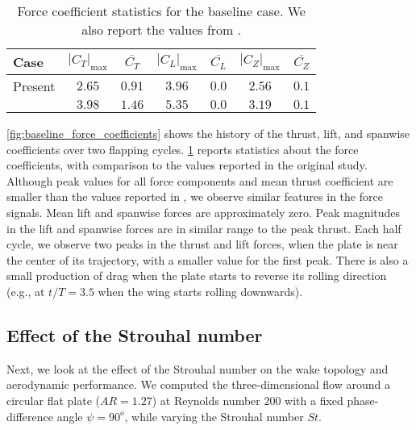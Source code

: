 \begin{table}[!h]
  \centering
  \begin{tabular}{lcccccc}
    \hline\hline
    Case & $\left| C_T \right|_\text{max}$ & $\overline{C_T}$ & $\left| C_L \right|_\text{max}$ & $\overline{C_L}$ & $\left| C_Z \right|_\text{max}$ & $\overline{C_Z}$ \\
    \hline
    Present & $2.65$ & $0.91$ & $3.96$ & $0.0$ & $2.56$ & $0.1$ \\
    \citet{li_dong_2016} & $3.98$ & $1.46$ & $5.35$ & $0.0$ & $3.19$ & $0.1$ \\
    \hline\hline
  \end{tabular}
  \caption{Force coefficient statistics for the baseline case. We also report the values from \citet{li_dong_2016}.}
  \label{tab:baseline_force_coefficients}
\end{table}

\cref{fig:baseline_force_coefficients} shows the history of the thrust, lift, and spanwise coefficients over two flapping cycles.
\cref{tab:baseline_force_coefficients} reports statistics about the force coefficients, with comparison to the values reported in the original study.
Although peak values for all force components and mean thrust coefficient are smaller than the values reported in \citet{li_dong_2016}, we observe similar features in the force signals.
Mean lift and spanwise forces are approximately zero.
Peak magnitudes in the lift and spanwise forces are in similar range to the peak thrust.
Each half cycle, we observe two peaks in the thrust and lift forces, when the plate is near the center of its trajectory, with a smaller value for the first peak.
There is also a small production of drag when the plate starts to reverse its rolling direction (e.g., at $t/T = 3.5$ when the wing starts rolling downwards).

\subsection{Effect of the Strouhal number}

Next, we look at the effect of the Strouhal number on the wake topology and aerodynamic performance.
We computed the three-dimensional flow around a circular flat plate ($AR = 1.27$) at Reynolds number $200$ with a fixed phase-difference angle $\psi = 90^o$, while varying the Strouhal number $St$.

